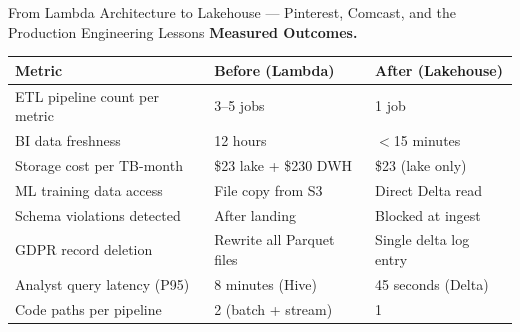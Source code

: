 \begin{casestudy}{From Lambda Architecture to Lakehouse ---
  Pinterest, Comcast, and the Production Engineering Lessons}
\textbf{Measured Outcomes.}
\begin{center}
\small
\renewcommand{\arraystretch}{1.25}
\begin{tabular}{lll}
  \toprule
  \textbf{Metric} & \textbf{Before (Lambda)} & \textbf{After (Lakehouse)} \\
  \midrule
  ETL pipeline count per metric  & 3--5 jobs   & 1 job \\
  BI data freshness              & 12 hours    & $<$15 minutes \\
  Storage cost per TB-month      & \$23 lake + \$230 DWH & \$23 (lake only) \\
  ML training data access        & File copy from S3 & Direct Delta read \\
  Schema violations detected     & After landing & Blocked at ingest \\
  GDPR record deletion           & Rewrite all Parquet files & Single delta log entry \\
  Analyst query latency (P95)    & 8 minutes (Hive) & 45 seconds (Delta) \\
  Code paths per pipeline        & 2 (batch + stream) & 1 \\
  \bottomrule
\end{tabular}
\end{center}


\end{casestudy}
